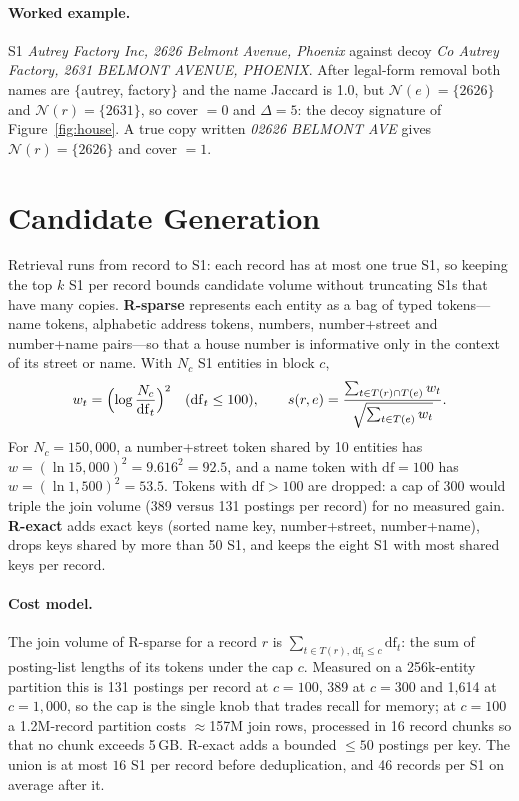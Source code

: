 \documentclass[10pt]{article}
\newcommand{\N}{\mathcal{N}}
\begin{document}
\paragraph{Worked example.} S1 \emph{Autrey Factory Inc, 2626 Belmont Avenue, Phoenix} against decoy \emph{Co Autrey Factory, 2631 BELMONT AVENUE, PHOENIX}. After legal-form removal both names are $\{$autrey, factory$\}$ and the name Jaccard is 1.0, but $\N(e) = \{2626\}$ and $\N(r) = \{2631\}$, so cover $= 0$ and $\Delta = 5$: the decoy signature of Figure~\ref{fig:house}. A true copy written \emph{02626 BELMONT AVE} gives $\N(r) = \{2626\}$ and cover $= 1$.

\section{Candidate Generation}
\label{sec:retrieval}
Retrieval runs from record to S1: each record has at most one true S1, so keeping the top $k$ S1 per record bounds candidate volume without truncating S1s that have many copies. \textbf{R-sparse} represents each entity as a bag of typed tokens---name tokens, alphabetic address tokens, numbers, number+street and number+name pairs---so that a house number is informative only in the context of its street or name. With $N_c$ S1 entities in block $c$,
\begin{equation}
w_t = \Bigl(\log \frac{N_c}{\mathrm{df}_t}\Bigr)^2 \quad (\mathrm{df}_t \le 100), \qquad s(r,e) = \frac{\sum_{t\in T(r)\cap T(e)} w_t}{\sqrt{\sum_{t\in T(e)} w_t}}.
\label{eq:idf}
\end{equation}
For $N_c = 150{,}000$, a number+street token shared by 10 entities has $w = (\ln 15{,}000)^2 = 9.616^2 = 92.5$, and a name token with $\mathrm{df} = 100$ has $w = (\ln 1{,}500)^2 = 53.5$. Tokens with $\mathrm{df} > 100$ are dropped: a cap of 300 would triple the join volume (389 versus 131 postings per record) for no measured gain. \textbf{R-exact} adds exact keys (sorted name key, number+street, number+name), drops keys shared by more than 50 S1, and keeps the eight S1 with most shared keys per record.

\paragraph{Cost model.} The join volume of R-sparse for a record $r$ is $\sum_{t\in T(r),\,\mathrm{df}_t\le c}\mathrm{df}_t$: the sum of posting-list lengths of its tokens under the cap $c$. Measured on a 256k-entity partition this is 131 postings per record at $c=100$, 389 at $c=300$ and 1,614 at $c=1{,}000$, so the cap is the single knob that trades recall for memory; at $c=100$ a 1.2M-record partition costs $\approx$157M join rows, processed in 16 record chunks so that no chunk exceeds 5\,GB. R-exact adds a bounded $\le 50$ postings per key. The union is at most $16$ S1 per record before deduplication, and 46 records per S1 on average after it.
\end{document}
